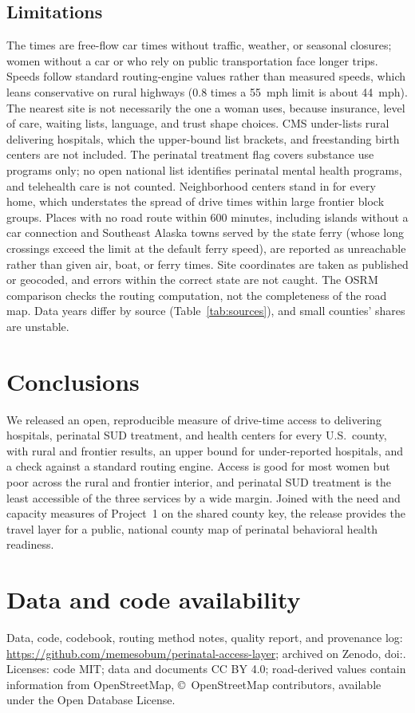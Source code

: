 \documentclass[10pt,twocolumn,letterpaper]{article}
\begin{document}
\subsection{Limitations}
The times are free-flow car times without traffic, weather, or seasonal closures; women without a car or who rely on public transportation face longer trips. Speeds follow standard routing-engine values rather than measured speeds, which leans conservative on rural highways (0.8 times a 55~mph limit is about 44~mph). The nearest site is not necessarily the one a woman uses, because insurance, level of care, waiting lists, language, and trust shape choices. CMS under-lists rural delivering hospitals, which the upper-bound list brackets, and freestanding birth centers are not included. The perinatal treatment flag covers substance use programs only; no open national list identifies perinatal mental health programs, and telehealth care is not counted. Neighborhood centers stand in for every home, which understates the spread of drive times within large frontier block groups. Places with no road route within 600 minutes, including islands without a car connection and Southeast Alaska towns served by the state ferry (whose long crossings exceed the limit at the default ferry speed), are reported as unreachable rather than given air, boat, or ferry times. Site coordinates are taken as published or geocoded, and errors within the correct state are not caught. The OSRM comparison checks the routing computation, not the completeness of the road map. Data years differ by source (Table~\ref{tab:sources}), and small counties' shares are unstable.

\section{Conclusions}\label{sec:concl}
We released an open, reproducible measure of drive-time access to delivering hospitals, perinatal SUD treatment, and health centers for every U.S.\ county, with rural and frontier results, an upper bound for under-reported hospitals, and a check against a standard routing engine. Access is good for most women but poor across the rural and frontier interior, and perinatal SUD treatment is the least accessible of the three services by a wide margin. Joined with the need and capacity measures of Project~1 on the shared county key, the release provides the travel layer for a public, national county map of perinatal behavioral health readiness.

\section*{Data and code availability}
Data, code, codebook, routing method notes, quality report, and provenance log: \url{https://github.com/memesobum/perinatal-access-layer}; archived on Zenodo, doi:\DOI. Licenses: code MIT; data and documents CC BY 4.0; road-derived values contain information from OpenStreetMap, \copyright\ OpenStreetMap contributors, available under the Open Database License.
\end{document}
